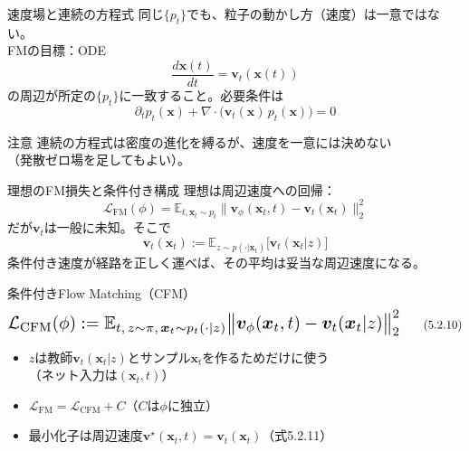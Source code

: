 \asmain
\begin{frame}{速度場と連続の方程式}
    同じ$\{p_t\}$でも、粒子の動かし方（速度）は一意ではない。\\
    FMの目標：ODE
    \[
        \dfrac{d\bm{x}(t)}{dt}=\bm{v}_t(\bm{x}(t))
    \]
    の周辺が所定の$\{p_t\}$に一致すること。必要条件は
    \[
        \partial_t p_t(\bm{x})
        +
        \nabla\cdot\bigl(\bm{v}_t(\bm{x})\,p_t(\bm{x})\bigr)
        =
        0
        \tag{5.2.8}
    \]
    \begin{block}{注意}
        連続の方程式は密度の進化を縛るが、速度を一意には決めない\\
        （発散ゼロ場を足してもよい）。
    \end{block}
\end{frame}
\asmain
\begin{frame}{理想のFM損失と条件付き構成}
    理想は周辺速度への回帰：
    \[
        \mathcal{L}_{\mathrm{FM}}(\phi)
        =
        \mathbb{E}_{t,\bm{x}_t\sim p_t}
        \bigl\|
        \bm{v}_\phi(\bm{x}_t,t)-\bm{v}_t(\bm{x}_t)
        \bigr\|_{2}^{2}
    \]
    だが$\bm{v}_t$は一般に未知。そこで
    \[
        \bm{v}_t(\bm{x}_t)
        :=
        \mathbb{E}_{z\sim p(\cdot|\bm{x}_t)}
        \bigl[\bm{v}_t(\bm{x}_t|z)\bigr]
        \tag{5.2.9}
    \]
    条件付き速度が経路を正しく運べば、その平均は妥当な周辺速度になる。
\end{frame}
\asmain
\begin{frame}{条件付きFlow Matching（CFM）}
    \[
        \resizebox{0.98\textwidth}{!}{$
        \mathcal{L}_{\mathrm{CFM}}(\phi)
        :=
        \mathbb{E}_{t,\,z\sim\pi,\,\bm{x}_t\sim p_t(\cdot|z)}
        \bigl\|
        \bm{v}_\phi(\bm{x}_t,t)-\bm{v}_t(\bm{x}_t|z)
        \bigr\|_{2}^{2}
        $}
        \tag{5.2.10}
    \]
    \begin{itemize}
        \item $z$は教師$\bm{v}_t(\bm{x}_t|z)$とサンプル$\bm{x}_t$を作るためだけに使う\\
        （ネット入力は$(\bm{x}_t,t)$）
        \item $\mathcal{L}_{\mathrm{FM}}=\mathcal{L}_{\mathrm{CFM}}+C$（$C$は$\phi$に独立）
        \item 最小化子は周辺速度$\bm{v}^{\star}(\bm{x}_t,t)=\bm{v}_t(\bm{x}_t)$（式5.2.11）
    \end{itemize}
\end{frame}
